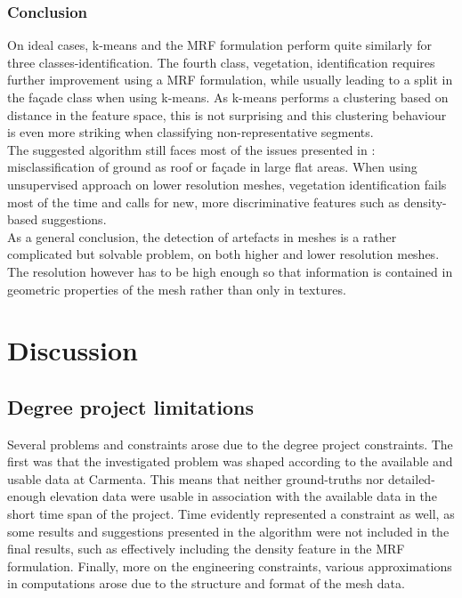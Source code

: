 \documentclass{kththesis}
\begin{document}
\subsection{Conclusion}
On ideal cases, k-means and the MRF formulation perform quite similarly for three classes-identification. The fourth class, vegetation, identification requires further improvement using a MRF formulation, while usually leading to a split in the façade class when using k-means.  As k-means performs a clustering based on distance in the feature space, this is not surprising and this clustering behaviour is even more striking when classifying non-representative segments. \\
The suggested algorithm still faces most of the issues presented in \textcite{rouhani, verdie}: misclassification of ground as roof or façade in large flat areas. When using \textcite{verdie} unsupervised approach on lower resolution meshes, vegetation identification fails most of the time and calls for new, more discriminative features such as density-based suggestions. \\ 
As a general conclusion, the detection of artefacts in meshes is a rather complicated but solvable problem, on both higher and lower resolution meshes. The resolution however has to be high enough so that information is contained in geometric properties of the mesh rather than only in textures.  

\chapter{Discussion}
\section{Degree project limitations}
Several problems and constraints arose due to the degree project constraints. The first was that the investigated problem was shaped according to the available and usable data at Carmenta. This means that neither ground-truths nor detailed-enough elevation data were usable in association with the available data in the short time span of the project. Time evidently represented a constraint as well, as some results and suggestions presented in the algorithm were not included in the final results, such as effectively including the density feature in the MRF formulation. Finally, more on the engineering constraints, various approximations in computations arose due to the structure and format of the mesh data. 
\end{document}
